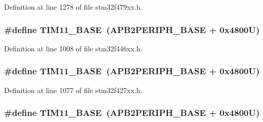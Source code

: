 Definition at line 1278 of file stm32f479xx.\+h.

\subsubsection[{\texorpdfstring{T\+I\+M11\+\_\+\+B\+A\+SE}{TIM11_BASE}}]{\setlength{\rightskip}{0pt plus 5cm}\#define T\+I\+M11\+\_\+\+B\+A\+SE~({\bf A\+P\+B2\+P\+E\+R\+I\+P\+H\+\_\+\+B\+A\+SE} + 0x4800\+U)}\hypertarget{group___peripheral__memory__map_ga3a4a06bb84c703084f0509e105ffaf1d}{}\label{group___peripheral__memory__map_ga3a4a06bb84c703084f0509e105ffaf1d}


Definition at line 1008 of file stm32f446xx.\+h.

\subsubsection[{\texorpdfstring{T\+I\+M11\+\_\+\+B\+A\+SE}{TIM11_BASE}}]{\setlength{\rightskip}{0pt plus 5cm}\#define T\+I\+M11\+\_\+\+B\+A\+SE~({\bf A\+P\+B2\+P\+E\+R\+I\+P\+H\+\_\+\+B\+A\+SE} + 0x4800\+U)}\hypertarget{group___peripheral__memory__map_ga3a4a06bb84c703084f0509e105ffaf1d}{}\label{group___peripheral__memory__map_ga3a4a06bb84c703084f0509e105ffaf1d}


Definition at line 1077 of file stm32f427xx.\+h.

\subsubsection[{\texorpdfstring{T\+I\+M11\+\_\+\+B\+A\+SE}{TIM11_BASE}}]{\setlength{\rightskip}{0pt plus 5cm}\#define T\+I\+M11\+\_\+\+B\+A\+SE~({\bf A\+P\+B2\+P\+E\+R\+I\+P\+H\+\_\+\+B\+A\+SE} + 0x4800\+U)}\hypertarget{group___peripheral__memory__map_ga3a4a06bb84c703084f0509e105ffaf1d}{}\label{group___peripheral__memory__map_ga3a4a06bb84c703084f0509e105ffaf1d}


